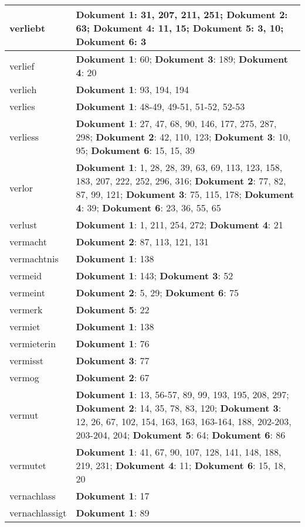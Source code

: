 \documentclass[a5paper]{article}
\begin{document}
\begin{longtable}[l]{|l|p{3in}|}
\hline
verliebt & \textbf{Dokument 1}: 31, 207, 211, 251; \textbf{Dokument 2}: 63; \textbf{Dokument 4}: 11, 15; \textbf{Dokument 5}: 3, 10; \textbf{Dokument 6}: 3 \\
\hline
verlief & \textbf{Dokument 1}: 60; \textbf{Dokument 3}: 189; \textbf{Dokument 4}: 20 \\
\hline
verlieh & \textbf{Dokument 1}: 93, 194, 194 \\
\hline
verlies & \textbf{Dokument 1}: 48-49, 49-51, 51-52, 52-53 \\
\hline
verliess & \textbf{Dokument 1}: 27, 47, 68, 90, 146, 177, 275, 287, 298; \textbf{Dokument 2}: 42, 110, 123; \textbf{Dokument 3}: 10, 95; \textbf{Dokument 6}: 15, 15, 39 \\
\hline
verlor & \textbf{Dokument 1}: 1, 28, 28, 39, 63, 69, 113, 123, 158, 183, 207, 222, 252, 296, 316; \textbf{Dokument 2}: 77, 82, 87, 99, 121; \textbf{Dokument 3}: 75, 115, 178; \textbf{Dokument 4}: 39; \textbf{Dokument 6}: 23, 36, 55, 65 \\
\hline
verlust & \textbf{Dokument 1}: 1, 211, 254, 272; \textbf{Dokument 4}: 21 \\
\hline
vermacht & \textbf{Dokument 2}: 87, 113, 121, 131 \\
\hline
vermachtnis & \textbf{Dokument 1}: 138 \\
\hline
vermeid & \textbf{Dokument 1}: 143; \textbf{Dokument 3}: 52 \\
\hline
vermeint & \textbf{Dokument 2}: 5, 29; \textbf{Dokument 6}: 75 \\
\hline
vermerk & \textbf{Dokument 5}: 22 \\
\hline
vermiet & \textbf{Dokument 1}: 138 \\
\hline
vermieterin & \textbf{Dokument 1}: 76 \\
\hline
vermisst & \textbf{Dokument 3}: 77 \\
\hline
vermog & \textbf{Dokument 2}: 67 \\
\hline
vermut & \textbf{Dokument 1}: 13, 56-57, 89, 99, 193, 195, 208, 297; \textbf{Dokument 2}: 14, 35, 78, 83, 120; \textbf{Dokument 3}: 12, 26, 67, 102, 154, 163, 163, 163-164, 188, 202-203, 203-204, 204; \textbf{Dokument 5}: 64; \textbf{Dokument 6}: 86 \\
\hline
vermutet & \textbf{Dokument 1}: 41, 67, 90, 107, 128, 141, 148, 188, 219, 231; \textbf{Dokument 4}: 11; \textbf{Dokument 6}: 15, 18, 20 \\
\hline
vernachlass & \textbf{Dokument 1}: 17 \\
\hline
vernachlassigt & \textbf{Dokument 1}: 89 \\

\end{longtable}
\end{document}
